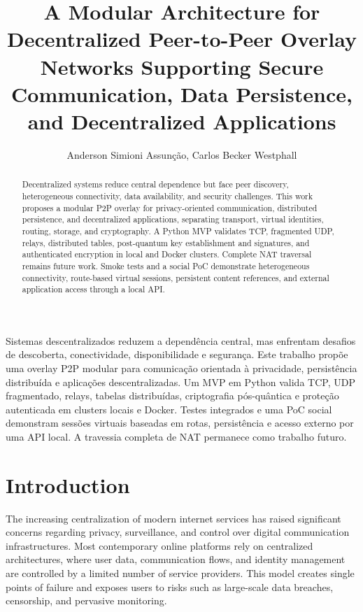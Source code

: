 \documentclass[12pt]{article}
\title{A Modular Architecture for Decentralized Peer-to-Peer Overlay Networks Supporting Secure Communication, Data Persistence, and Decentralized Applications}
\author{Anderson Simioni Assunção\inst{1}, Carlos Becker Westphall\inst{1}}
\date{}
\begin{document}
\maketitle

\begin{abstract}
Decentralized systems reduce central dependence but face peer discovery, heterogeneous connectivity, data availability, and security challenges. This work proposes a modular P2P overlay for privacy-oriented communication, distributed persistence, and decentralized applications, separating transport, virtual identities, routing, storage, and cryptography. A Python MVP validates TCP, fragmented UDP, relays, distributed tables, post-quantum key establishment and signatures, and authenticated encryption in local and Docker clusters. Complete NAT traversal remains future work. Smoke tests and a social PoC demonstrate heterogeneous connectivity, route-based virtual sessions, persistent content references, and external application access through a local API.
\end{abstract}

\begin{resumo}
Sistemas descentralizados reduzem a dependência central, mas enfrentam desafios de descoberta, conectividade, disponibilidade e segurança. Este trabalho propõe uma overlay P2P modular para comunicação orientada à privacidade, persistência distribuída e aplicações descentralizadas. Um MVP em Python valida TCP, UDP fragmentado, relays, tabelas distribuídas, criptografia pós-quântica e proteção autenticada em clusters locais e Docker. Testes integrados e uma PoC social demonstram sessões virtuais baseadas em rotas, persistência e acesso externo por uma API local. A travessia completa de NAT permanece como trabalho futuro.
\end{resumo}

\section{Introduction}
The increasing centralization of modern internet services has raised significant concerns regarding privacy, surveillance, and control over digital communication infrastructures. Most contemporary online platforms rely on centralized architectures, where user data, communication flows, and identity management are controlled by a limited number of service providers. This model creates single points of failure and exposes users to risks such as large-scale data breaches, censorship, and pervasive monitoring.
\end{document}
